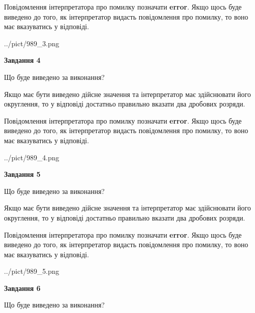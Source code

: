 \documentclass[12pt, ukrainian]{article}
\begin{document}
{\begin {Large}
Повідомлення інтерпретатора про помилку позначати \textbf{error}.
Якщо щось буде виведено до того, як інтерпретатор видасть повідомлення про помилку, 
то воно має вказуватись у відповіді. \par

\begin{center}
	{../pict/989_3.png}
\end{center}
\newpage

{\begin {center}\textbf{Завдання 4}\end {center}}\par
Що буде виведено за виконання? \par

Якщо має бути виведено дійсне значення та інтерпретатор має здійснювати його округлення, 
то у відповіді достатньо правильно вказати два дробових розряди.

Повідомлення інтерпретатора про помилку позначати \textbf{error}.
Якщо щось буде виведено до того, як інтерпретатор видасть повідомлення про помилку, 
то воно має вказуватись у відповіді. \par

\begin{center}
	{../pict/989_4.png}
\end{center}
\newpage

{\begin {center}\textbf{Завдання 5}\end {center}}\par
Що буде виведено за виконання? \par

Якщо має бути виведено дійсне значення та інтерпретатор має здійснювати його округлення, 
то у відповіді достатньо правильно вказати два дробових розряди.

Повідомлення інтерпретатора про помилку позначати \textbf{error}.
Якщо щось буде виведено до того, як інтерпретатор видасть повідомлення про помилку, 
то воно має вказуватись у відповіді. \par

\begin{center}
	{../pict/989_5.png}
\end{center}
\newpage

{\begin {center}\textbf{Завдання 6}\end {center}}\par
Що буде виведено за виконання? \par


\end{Large}}
\end{document}
